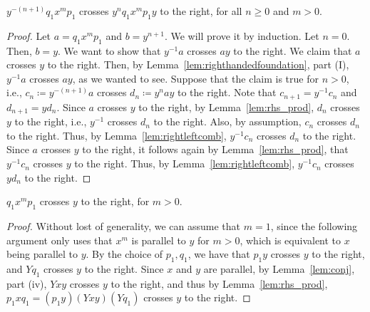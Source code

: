 \begin{lemma}
$y^{-(n+1)} q_1 x^m p_1$ crosses $y^n q_1 x^m p_1 y$ to the right, for all $n \geq 0$ and $m>0$.
\label{lem:diagonals}
\end{lemma}
\begin{proof}
Let $a=q_1 x^m p_1$ and $b=y^{n+1}$.
We will prove it by induction.
Let $n=0$. Then, $b=y$.
We want to show that $y^{-1}a$ crosses $a y$ to the right.
We claim that $a$ crosses $y$ to the right.
Then, by Lemma~\ref{lem:righthandedfoundation}, part (I), $y^{-1}a$ crosses $ay$, as we wanted to see.
Suppose that the claim is true for $n>0$, i.e., $c_n \coloneqq y^{-(n+1)}a$ crosses $d_n \coloneqq y^n a y$ to the right.
Note that $c_{n+1} = y^{-1} c_n$ and $d_{n+1}=y d_n$.
Since $a$ crosses $y$ to the right, by Lemma~\ref{lem:rhs_prod}, $d_n$ crosses $y$ to the right, i.e., $y^{-1}$ crosses $d_n$ to the right.
Also, by assumption, $c_n$ crosses $d_n$ to the right.
Thus, by Lemma~\ref{lem:rightleftcomb}, $y^{-1} c_n$ crosses $d_n$ to the right.
Since $a$ crosses $y$ to the right, it follows again by Lemma~\ref{lem:rhs_prod},  that $y^{-1}c_n$ crosses $y$ to the right. Thus, by Lemma~\ref{lem:rightleftcomb}, $y^{-1}c_n$ crosses $y d_n$ to the right.
\end{proof}

\begin{claim}
 $q_1 x^m p_1$ crosses $y$ to the right, for $m>0$.
 \label{lem:cross2}
\end{claim}
\begin{proof}
Without lost of generality, we can assume that $m=1$, since the following argument only uses that $x^m$ is parallel to $y$ for $m>0$, which is equivalent to $x$ being parallel to $y$.
By the choice of $p_1,q_1$, we have that $p_1y$ crosses $y$ to the right, and $Yq_1$ crosses $y$ to the right.
Since $x$ and $y$ are parallel, by Lemma~\ref{lem:conj}, part (iv), $Yxy$ crosses $y$ to the right, and thus by Lemma~\ref{lem:rhs_prod}, $p_1xq_1=(p_1y)(Yxy)(Yq_1)$ crosses $y$ to the right.
\end{proof}